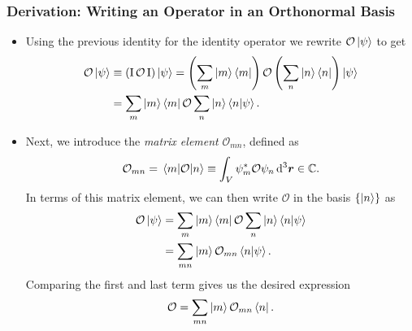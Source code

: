 \documentclass[11pt, a4paper]{article}
\newcommand{\diff}{\mathop{}\!\mathrm{d}} %
\newcommand{\dr}{\diff^{3} \r}  %
\renewcommand{\vec}[1]{\bm{#1}}  %
\renewcommand{\r}{\vec{r}}  %
\renewcommand{\O}{\mathcal{O}}  %
\newcommand{\II}{\operatorname{I}}  %
\newcommand{\p}{\psi}  %
\begin{document}
\subsubsection{Derivation: Writing an Operator in an Orthonormal Basis}
\begin{itemize}
	\item Using the previous identity for the identity operator we rewrite $ \O \ket{\psi} $ to get
	\begin{align*}
		\O \ket{\p} &\equiv (\II \O \II) \ket{\p} = \left(\sum_{m} \ket{m} \bra{m}\right) \O \left(\sum_{n} \ket{n} \bra{n}\right) \ket{\p}\\
		& = \sum_{m}\ket{m}\bra{m} \O \sum_{n} \ket{n} \braket{n}{\p}.
	\end{align*}
	
	\item Next, we introduce the \textit{matrix element} $ \O_{mn} $, defined as
	\begin{equation*}
		\O_{mn} = \mel{m}{\O}{n} \equiv \int_{V} \psi_{m}^{*} \O \psi_{n} \dr \in \mathbb{C}.
	\end{equation*}
	In terms of this matrix element, we can then write $ \O $ in the basis $ \{\ket{n}\} $ as
	\begin{align*}
		\O \ket{\p} & = \sum_{m}\ket{m}\bra{m} \O \sum_{n} \ket{n} \braket{n}{\p}\\
		& = \sum_{mn} \ket{m}\O_{mn}\bra{n} \ket{\p}.
	\end{align*}
    Comparing the first and last term gives us the desired expression
	\begin{equation*}
		\O = \sum_{mn} \ket{m}\O_{mn}\bra{n}.
	\end{equation*}
	
\end{itemize}
\end{document}
